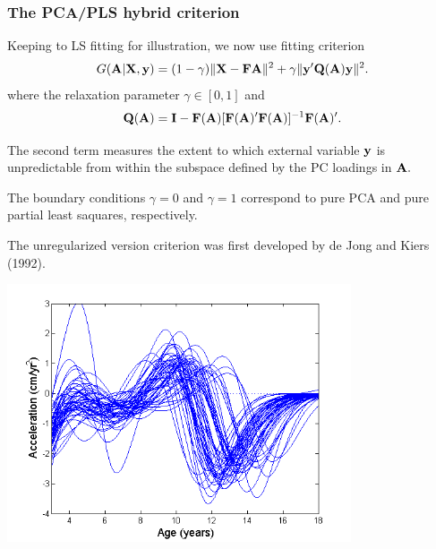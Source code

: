 \documentclass[11pt]{beamer}
\begin{document}

\begin{frame}

\frametitle{The PCA/PLS hybrid criterion}

\bi
  \item Keeping to LS fitting for illustration, we now use fitting criterion
  \[
    G(\mbox{\bf A}| \mbox{\bf X}, \mbox{\bf y}) = (1-\gamma) \| \mbox{\bf X} - \mbox{\bf F} \mbox{\bf A} \|^2 +
                                    \gamma \| \mbox{\bf y}' \mbox{\bf Q}(\mbox{\bf A}) \mbox{\bf y} \|^2.
  \]
  where the relaxation parameter $\gamma \in [0,1]$ and
  \[
    \mbox{\bf Q}(\mbox{\bf A}) = \mbox{\bf I} - \mbox{\bf F}(\mbox{\bf A}) [\mbox{\bf F}(\mbox{\bf A})' \mbox{\bf F}(\mbox{\bf A})]^{-1} \mbox{\bf F}(\mbox{\bf A})'.
  \]
  \item The second term measures the extent to which external variable $\mbox{\bf y}$ is unpredictable from within the subspace defined by the PC loadings in $\mbox{\bf A}.$
  \item The boundary conditions $\gamma = 0$ and $\gamma = 1$ correspond to pure PCA and pure partial least saquares, respectively.
  \item The unregularized version criterion was first developed by de Jong and Kiers (1992).
\ei

\end{frame}


\begin{frame}

\begin{center}
\includegraphics[width=4in]{figs/FemaleAccel.png}
\end{center}

\end{frame}
\end{document}
